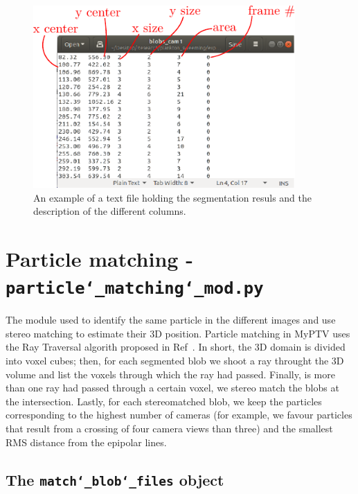 \documentclass[10pt,a4paper]{article}
\begin{document}
\begin{figure}[h!]
	\centering
	\includegraphics[width=10cm]{blob_file.pdf}
	\caption{An example of a text file holding the segmentation resuls and the description of the different columns. \label{fig:blobfile}} 
\end{figure}








\section{Particle matching - \texttt{particle\char`_matching\char`_mod.py}}

The module used to identify the same particle in the different images and use stereo matching to estimate their 3D position. Particle matching in MyPTV uses the Ray Traversal algorith proposed in Ref~\cite{Bourgoin2020}. In short, the 3D domain is divided into voxel cubes; then, for each segmented blob we shoot a ray throught the 3D volume and list the voxels through which the ray had passed. Finally, is more than one ray had passed through a certain voxel, we stereo match the blobs at the intersection. Lastly, for each stereomatched blob, we keep the particles corresponding to the highest number of cameras (for example, we favour particles that result from a crossing of four camera views than three) and the smallest RMS distance from the epipolar lines.  


\subsection{The \texttt{match\char`_blob\char`_files} object}
\end{document}

